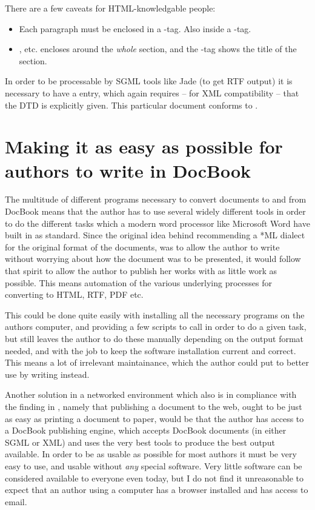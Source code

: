 There are a few caveats for HTML-knowledgable people:

\begin{itemize}
\item Each paragraph must be enclosed in a -tag.  Also
  inside a -tag.
\item {},  etc. encloses around the \textit{whole} section, and the
  -tag shows the title of the section.
\end{itemize}  
In order to be processable by SGML tools like Jade (to get RTF output)
it is necessary to have a  entry, which again requires
-- for XML compatibility -- that the DTD is explicitly given.  This
particular document conforms to
.





\section{Making it as easy as possible for authors to write in DocBook}
\label{sec:making-it-as-easy-as-possible-for-authors-to-write-in-docbook}

The multitude of different programs necessary to convert documents to
and from DocBook means that the author has to use several widely
different tools in order to do the different tasks which a modern word
processor like Microsoft Word have built in as standard.  Since the
original idea behind recommending a *ML dialect for the original
format of the documents, was to allow the author to write without
worrying about how the document was to be presented, it would follow
that spirit to allow the author to publish her works with as little
work as possible.  This means automation of the various underlying
processes for converting to HTML, RTF, PDF etc.

This could be done quite easily with installing all the necessary
programs on the authors computer, and providing a few scripts to call
in order to do a given task, but still leaves the author to do these
manually depending on the output format needed, and with the job to
keep the software installation current and correct.   This means a lot
of irrelevant maintainance, which the author could put to better use
by writing instead.  

Another solution in a networked environment which also is in
compliance with the finding in
,
namely that publishing a document to the web, ought to be just as easy
as printing a document to paper, would be that the author has access
to a DocBook publishing engine, which accepts DocBook documents (in
either SGML or XML) and uses the very best tools to produce the best
output available.  In order to be as usable as possible for most
authors it must be very easy to use, and usable without \textit{any}
special software.  Very little software can be considered available to
everyone even today, but I do not find it unreasonable to expect that
an author using a computer has a browser installed and has access to
email.

